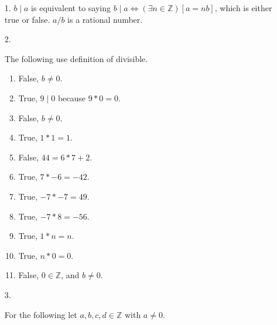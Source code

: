 \documentclass[11pt]{exam}
\author{@dante}
\begin{document}

\begin{enumerate}[leftmargin=0pt]

\item[1.] $b \mid a$ is equivalent to saying $b \mid a \Leftrightarrow (\exists n \in \mathbb{Z})[a = nb]$, which is either true or false. $a/b$ is a rational number. 

\item[2.] 

The following use definition of divisible.

\begin{enumerate}[label=(\alph*)]
    \item False, $b \neq 0$.
    \item True, $9 \mid 0$ because $9*0 = 0$.
    \item False, $b \neq 0$.
    \item True, $1*1 = 1$.
    \item False, $44 = 6*7 + 2$.
    \item True, $7*-6 = -42$.
    \item True, $-7*-7 = 49$.
    \item True, $-7*8 = -56$.
    \item True, $1*n = n$.
    \item True, $n*0 = 0$.
    \item False, $0 \in \mathbb{Z}$, and $b \neq 0$.
\end{enumerate}

\item[3.] 

For the following let $a, b, c, d \in \mathbb{Z}$ with $a \neq 0$.


\end{enumerate}
\end{document}
